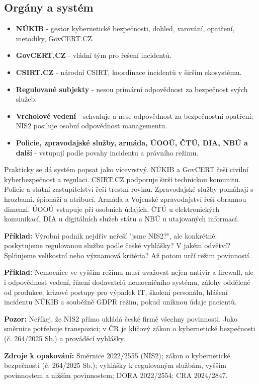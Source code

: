 \documentclass[11pt,a4paper]{article}
\newcommand{\pozor}[1]{\begin{tcolorbox}[breakable,enhanced,colback=red!7,colframe=red!30!black,boxrule=0pt,arc=1mm,left=5pt,right=5pt,top=5pt,bottom=5pt,before skip=6pt,after skip=6pt]\textbf{Pozor:} #1\end{tcolorbox}}
\newcommand{\priklad}[1]{\begin{tcolorbox}[breakable,enhanced,colback=green!7,colframe=green!30!black,boxrule=0pt,arc=1mm,left=5pt,right=5pt,top=5pt,bottom=5pt,before skip=6pt,after skip=6pt]\textbf{Příklad:} #1\end{tcolorbox}}
\newcommand{\zdroje}[1]{\medskip\noindent\textbf{Zdroje k opakování:} #1\medskip}
\begin{document}
\subsection*{Orgány a systém}
\begin{itemize}
  \item \textbf{NÚKIB} - gestor kybernetické bezpečnosti, dohled, varování, opatření, metodiky, GovCERT.CZ.
  \item \textbf{GovCERT.CZ} - vládní tým pro řešení incidentů.
  \item \textbf{CSIRT.CZ} - národní CSIRT, koordinace incidentů v širším ekosystému.
  \item \textbf{Regulované subjekty} - nesou primární odpovědnost za bezpečnost svých služeb.
  \item \textbf{Vrcholové vedení} - schvaluje a nese odpovědnost za bezpečnostní opatření; NIS2 posiluje osobní odpovědnost managementu.
  \item \textbf{Policie, zpravodajské služby, armáda, ÚOOÚ, ČTÚ, DIA, NBÚ a další} - vstupují podle povahy incidentu a právního režimu.
\end{itemize}

Prakticky se dá systém popsat jako vícevrstvý. NÚKIB a GovCERT řeší civilní kyberbezpečnost a regulaci. CSIRT.CZ podporuje širší technickou komunitu. Policie a státní zastupitelství řeší trestní rovinu. Zpravodajské služby pomáhají s hrozbami, špionáží a atribucí. Armáda a Vojenské zpravodajství řeší obrannou dimenzi. ÚOOÚ vstupuje při osobních údajích, ČTÚ u elektronických komunikací, DIA u digitálních služeb státu a NBÚ u utajovaných informací.

\priklad{Výrobní podnik nejdřív neřeší "jsme NIS2?", ale konkrétně: poskytujeme regulovanou službu podle české vyhlášky? V jakém odvětví? Splňujeme velikostní nebo významová kritéria? Až potom určí režim povinností.}

\priklad{Nemocnice ve vyšším režimu musí uvažovat nejen antivir a firewall, ale i odpovědnost vedení, řízení dodavatelů nemocničního systému, zálohy oddělené od produkce, krizové postupy pro výpadek IT, školení personálu, hlášení incidentu NÚKIB a souběžně GDPR režim, pokud uniknou údaje pacientů.}

\pozor{Neříkej, že NIS2 přímo ukládá české firmě všechny povinnosti. Jako směrnice potřebuje transpozici; v ČR je klíčový zákon o kybernetické bezpečnosti (č. 264/2025 Sb.) a prováděcí vyhlášky.}

\zdroje{Směrnice 2022/2555 (NIS2); zákon o kybernetické bezpečnosti (č. 264/2025 Sb.); vyhlášky k regulovaným službám, vyšším povinnostem a nižším povinnostem; DORA 2022/2554; CRA 2024/2847.}
\end{document}
